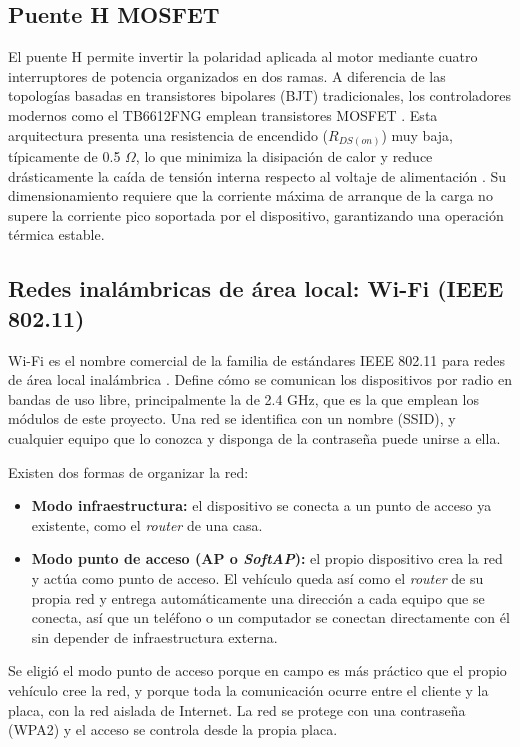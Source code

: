 \documentclass[journal]{IEEEtran}
\begin{document}
\subsection{Puente H MOSFET}
El puente H permite invertir la polaridad aplicada al motor mediante cuatro interruptores de potencia organizados en dos ramas. A diferencia de las topologías basadas en transistores bipolares (BJT) tradicionales, los controladores modernos como el TB6612FNG emplean transistores MOSFET \cite{tb6612fng}. Esta arquitectura presenta una resistencia de encendido ($R_{DS(on)}$) muy baja, típicamente de 0.5 $\Omega$, lo que minimiza la disipación de calor y reduce drásticamente la caída de tensión interna respecto al voltaje de alimentación \cite{tb6612fng}. Su dimensionamiento requiere que la corriente máxima de arranque de la carga no supere la corriente pico soportada por el dispositivo, garantizando una operación térmica estable.

\subsection{Redes inalámbricas de área local: Wi-Fi (IEEE 802.11)}

Wi-Fi es el nombre comercial de la familia de estándares IEEE 802.11 para redes de área local inalámbrica \cite{ieee80211}. Define cómo se comunican los dispositivos por radio en bandas de uso libre, principalmente la de 2.4 GHz, que es la que emplean los módulos de este proyecto. Una red se identifica con un nombre (SSID), y cualquier equipo que lo conozca y disponga de la contraseña puede unirse a ella.

Existen dos formas de organizar la red:

\begin{itemize}
\item \textbf{Modo infraestructura:} el dispositivo se conecta a un punto de acceso ya existente, como el \emph{router} de una casa.
\item \textbf{Modo punto de acceso (AP o \emph{SoftAP}):} el propio dispositivo crea la red y actúa como punto de acceso. El vehículo queda así como el \emph{router} de su propia red y entrega automáticamente una dirección a cada equipo que se conecta, así que un teléfono o un computador se conectan directamente con él sin depender de infraestructura externa.
\end{itemize}

Se eligió el modo punto de acceso porque en campo es más práctico que el propio vehículo cree la red, y porque toda la comunicación ocurre entre el cliente y la placa, con la red aislada de Internet. La red se protege con una contraseña (WPA2) y el acceso se controla desde la propia placa.
\end{document}
